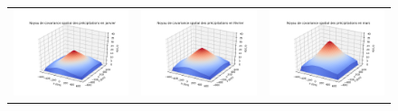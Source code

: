 \documentclass[a4paper,11pt]{article}
\numberwithin{equation}{section}
\begin{document}
\begin{figure}[H]
\hspace{-1.3cm}
\begin{tabular}{ccc} 
	\includegraphics[scale=0.34]{images/kernel_precip_m1.png} & \includegraphics[scale=0.34]{images/kernel_precip_m2.png} & \includegraphics[scale=0.34]{images/kernel_precip_m3.png} \\ 

\end{tabular}
\end{figure}
\end{document}
